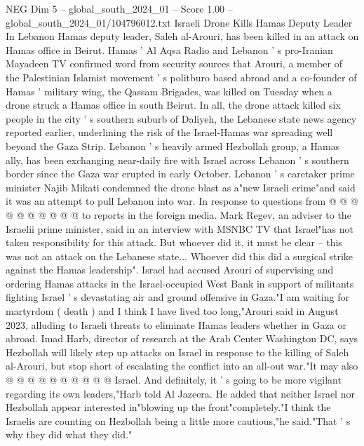 \begin{textsample}{NEG Dim 5 – global\_south\_2024\_01 – Score 1.00 – global\_south\_2024\_01/104796012.txt}  \label{ex:f5_neg_435}
Israeli Drone Kills Hamas Deputy Leader In Lebanon Hamas deputy leader, Saleh al-Arouri, has been killed in an attack on Hamas office in Beirut.
Hamas ' Al Aqsa Radio and Lebanon ' s pro-Iranian Mayadeen TV confirmed word from security sources that Arouri, a member of the Palestinian Islamist movement ' s politburo based abroad and a co-founder of Hamas ' military wing, the Qassam Brigades, was killed on Tuesday when a drone struck a Hamas office in south Beirut.
In all, the drone attack killed six people in the city ' s southern suburb of Daliyeh, the Lebanese state news agency reported earlier, underlining the risk of the Israel-Hamas war spreading well beyond the Gaza Strip.
Lebanon ' s heavily armed Hezbollah group, a Hamas ally, has been exchanging near-daily fire with Israel across Lebanon ' s southern border since the Gaza war erupted in early October.
Lebanon ' s caretaker prime minister Najib Mikati condemned the drone blast as a"new Israeli crime"and said it was an attempt to pull Lebanon into war.
In response to questions from @ @ @ @ @ @ @ @ @ @ to reports in the foreign media.
Mark Regev, an adviser to the Israelii prime minister, said in an interview with MSNBC TV that Israel"has not taken responsibility for this attack.
But whoever did it, it must be clear -- this was not an attack on the Lebanese state...
Whoever did this did a surgical strike against the Hamas leadership".
Israel had accused Arouri of supervising and ordering Hamas attacks in the Israel-occupied West Bank in support of militants fighting Israel ' s devastating air and ground offensive in Gaza."I am waiting for martyrdom ( death ) and I think I have lived too long,"Arouri said in August 2023, alluding to Israeli threats to eliminate Hamas leaders whether in Gaza or abroad.
Imad Harb, director of research at the Arab Center Washington DC, says Hezbollah will likely step up attacks on Israel in response to the killing of Saleh al-Arouri, but stop short of escalating the conflict into an all-out war."It may also @ @ @ @ @ @ @ @ @ @ Israel.
And definitely, it ' s going to be more vigilant regarding its own leaders,"Harb told Al Jazeera.
He added that neither Israel nor Hezbollah appear interested in"blowing up the front"completely."I think the Israelis are counting on Hezbollah being a little more cautious,"he said."That ' s why they did what they did."

\end{textsample}
